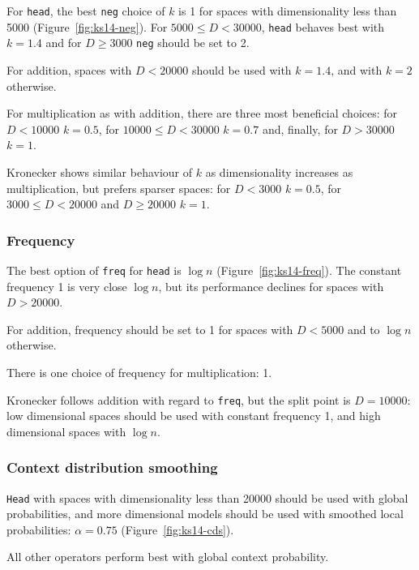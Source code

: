 
For \texttt{head}, the best \texttt{neg} choice of $k$ is 1 for spaces with dimensionality less than 5000 (Figure~\ref{fig:ks14-neg}). For $5000 \leq D < 30000$, \texttt{head} behaves best with $k = 1.4$ and for $D \geq 3000$ \texttt{neg} should be set to 2.

For addition, spaces with $D < 20000$ should be used with $k = 1.4$, and with $k = 2$ otherwise.

For multiplication as with addition, there are three most beneficial choices: for $D < 10000$ $k = 0.5$, for $10000 \leq D < 30000$ $k = 0.7$ and, finally, for $D > 30000$ $k = 1$.

Kronecker shows similar behaviour of $k$ as dimensionality increases as multiplication, but prefers sparser spaces: for $D < 3000$ $k = 0.5$, for $3000 \leq D < 20000$ and $D \geq 20000$ $k = 1$.

\subsubsection{Frequency}
The best option of \texttt{freq} for \texttt{head} is $\log n$ (Figure~\ref{fig:ks14-freq}). The constant frequency 1 is very close $\log n$, but its performance declines for spaces with $D > 20000$.

For addition, frequency should be set to 1 for spaces with $D < 5000$ and to $\log n$ otherwise.

There is one choice of frequency for multiplication: 1.

Kronecker follows addition with regard to \texttt{freq}, but the split point is $D = 10000$: low dimensional spaces should be used with constant frequency 1, and high dimensional spaces with $\log n$.

\subsubsection{Context distribution smoothing}


\texttt{Head} with spaces with dimensionality less than 20000 should be used with global probabilities, and more dimensional models should be used with smoothed local probabilities: $\alpha = 0.75$ (Figure~\ref{fig:ks14-cds}).

All other operators perform best with global context probability.

